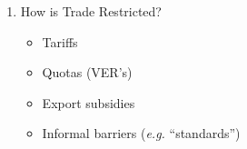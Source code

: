 \documentclass[12pt]{article}
\begin{document}
\begin{enumerate}
      \item How is Trade Restricted?

        \begin{itemize}

          \item Tariffs

          \item Quotas (VER's)

          \item Export subsidies

          \item Informal barriers (\textit{e.g.} “standards”)

        \end{itemize}

\end{enumerate}
\end{document}
